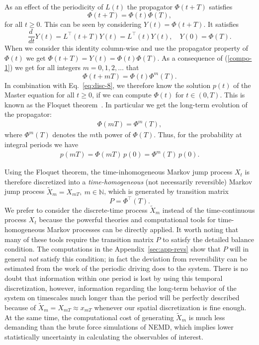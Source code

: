 \documentclass[journal=jctcce,manuscript=article]{achemso}
\newcommand{\vect}[1]{#1}
\newcommand{\myphi}{\Phi}
\begin{document}
As an effect of the periodicity of $\vect L(t)$ the propagator $\myphi(t+T)$
satisfies
\begin{equation}\label{compo-1}
\myphi(t+T)=\myphi(t)\myphi(T),
\end{equation}
for all $t\ge 0$. This can be seen by considering $\vect Y(t)=\myphi(t+T)$. It satisfies
\[
\frac{d\ }{dt}\vect Y(t)=\vect L^{\top}(t+T) \vect Y(t)=\vect L^{\top}(t)\vect Y(t),\quad \vect Y(0)=\myphi(T).
\]
When we consider this identity column-wise and use the propagator property of $\myphi(t)$ we get $\myphi(t+T)=\vect Y(t)=\myphi(t)\myphi(T)$. As a consequence of (\ref{compo-1}) we get for all integers $m=0,1,2,\ldots$ that 
\begin{equation}\label{compo-2}
\myphi(t+mT)=\myphi(t)\myphi^m(T).
\end{equation}
In combination with Eq.~\eqref{eq:disc-8}, we therefore
know the solution $\vect p(t)$ of the Master equation for all $t\ge 0$,
if we can compute $\myphi(t)$ for $t\in (0,T)$.
This is known as the Floquet theorem~\cite{floquet1883equations}.
In particular we get the long-term evolution of the propagator:
\begin{align}
\label{eq:floq-13}  
\myphi(mT)=\myphi^m(T),
\end{align}
where $\myphi^m(T)$ denotes the $m$th power of $\myphi(T)$. Thus, for the probability at integral periods we have
\begin{align}
  \label{eq:floq-dynamics}
  p(mT) =  \myphi(mT)\, p(0) = \myphi^m(T)\, p(0).
\end{align}


Using the Floquet theorem, the time-inhomogeneous Markov jump process $X_t$
is therefore discretized into a \emph{time-homogeneous} (not necessarily
reversible) Markov jump process $\tilde X_{m} = X_{mT}, \ m\in\mathbb
N$, which is generated by transition matrix
\begin{equation}\label{P}
\vect P=\myphi^{\top}(T).
\end{equation}
We prefer to consider the discrete-time process $\tilde X_{m}$ instead of the time-continuous process $X_t$
because the powerful theories and
computational tools for time-homogeneous Markov processes can be directly applied. It worth noting that many of these tools require the transition matrix $P$ to satisfy the detailed balance condition. The computations in the Appendix~\ref{sec:app-revs} show that $P$ will in general \emph{not} satisfy this condition; in fact  the deviation {from} reversibility can be estimated from the work of the periodic driving does to the system.
There is no doubt that information within one period is lost by using this temporal
discretization, however, information regarding the long-term behavior of the system on timescales
much longer than the period will be perfectly described because of $\tilde X_{m} = X_{mT}\approx x_{mT}$ whenever our spatial discretization is fine enough.
At the same time,
the computational cost of generating $\tilde X_{m}$ is much less demanding
than the brute force simulations of NEMD, which implies lower
statistically uncertainty in calculating the observables of interest.
\end{document}
